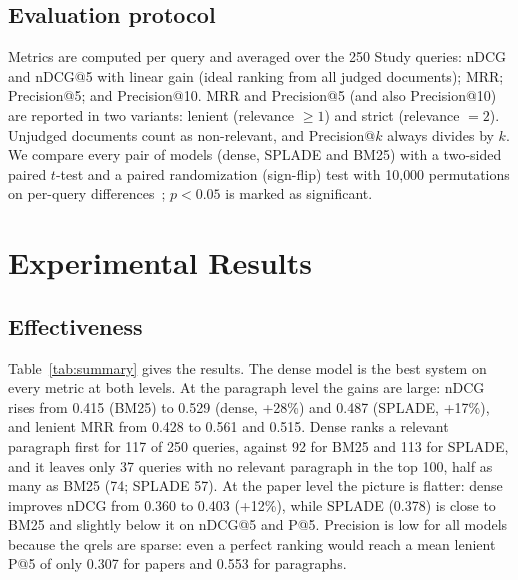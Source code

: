 \documentclass[sigconf,nonacm]{acmart}
\begin{document}
\subsection{Evaluation protocol}
Metrics are computed per query and averaged over the 250 Study queries: nDCG and nDCG@5 with linear gain (ideal ranking from all judged documents); MRR; Precision@5; and Precision@10. MRR and Precision@5 (and also Precision@10) are reported in two variants: lenient (relevance $\ge 1$) and strict (relevance $=2$). Unjudged documents count as non-relevant, and Precision@$k$ always divides by $k$. We compare every pair of models (dense, SPLADE and BM25) with a two-sided paired $t$-test and a paired randomization (sign-flip) test with 10{,}000 permutations on per-query differences~\cite{smucker}; $p<0.05$ is marked as significant.

\section{Experimental Results}


\subsection{Effectiveness}
Table~\ref{tab:summary} gives the results. The dense model is the best system on every metric at both levels. At the paragraph level the gains are large: nDCG rises from 0.415 (BM25) to 0.529 (dense, +28\%) and 0.487 (SPLADE, +17\%), and lenient MRR from 0.428 to 0.561 and 0.515. Dense ranks a relevant paragraph first for 117 of 250 queries, against 92 for BM25 and 113 for SPLADE, and it leaves only 37 queries with no relevant paragraph in the top 100, half as many as BM25 (74; SPLADE 57). At the paper level the picture is flatter: dense improves nDCG from 0.360 to 0.403 (+12\%), while SPLADE (0.378) is close to BM25 and slightly below it on nDCG@5 and P@5. Precision is low for all models because the qrels are sparse: even a perfect ranking would reach a mean lenient P@5 of only 0.307 for papers and 0.553 for paragraphs.
\end{document}
